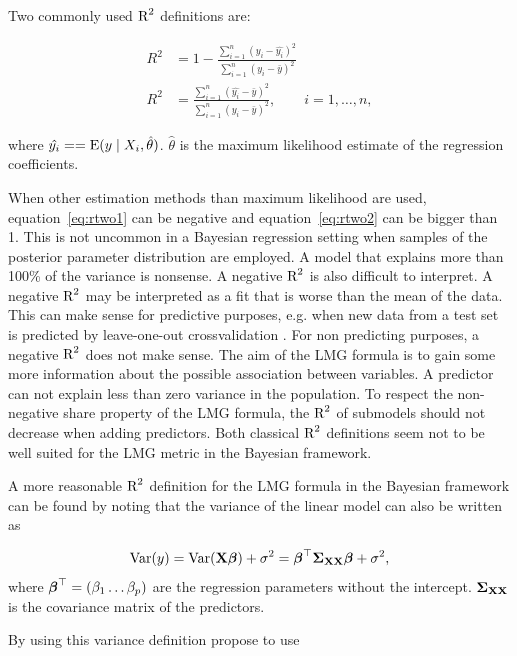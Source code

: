 \documentclass[11pt,a4paper,twoside]{book}\usepackage[]{graphicx}\usepackage[]{color}
\begin{document}
Two commonly used $\text{R}^2$ definitions are:
   
      \begin{align} 
     R^2 &= 1 - \frac{\sum_{i=1}^{n}(y_{i} - \hat{y_{i}})^2}{\sum_{i=1}^{n}(y_{i}-\bar{y})^2}   \label{eq:rtwo1} \\
     R^2 &= \frac{\sum_{i=1}^{n}(\hat{y_{i}} - \bar{y})^2}{\sum_{i=1}^{n}(y_{i}-\bar{y})^2}, \qquad i = 1,\dots,n,   \label{eq:rtwo2} 
   \end{align} 
   
where $\hat{y_{i}} = = \operatorname{E} ({y \mid X_{i}, \hat{\theta}})$.  $\hat{\theta}$ is the maximum likelihood estimate of the regression coefficients.


When other estimation methods than maximum likelihood are used, equation~\eqref{eq:rtwo1} can be negative and equation~\eqref{eq:rtwo2}  can be bigger than 1. This is not uncommon in a Bayesian regression setting when samples of the posterior parameter distribution are employed. A model that explains more than 100\% of the variance is nonsense. A negative $\text{R}^2$ is also difficult to interpret. A negative $\text{R}^2$ may be interpreted as a fit that is worse than the mean of the data. This can make sense for predictive purposes, e.g. when new data from a test set is predicted by leave-one-out crossvalidation \citep{Alexander2015}.  For non predicting purposes, a negative $\text{R}^2$ does not make sense. The aim of the LMG formula is to gain some more information about the possible association between variables. A predictor can not explain less than zero variance in the population. To respect the non-negative share property of the LMG formula, the $\text{R}^2$ of submodels should not decrease when adding predictors. Both classical $\text{R}^2$ definitions seem not to be well suited for the LMG metric in the Bayesian framework.

A more reasonable $\text{R}^2$ definition for the LMG formula in the Bayesian framework can be found by noting that the variance of the linear model can also be written as 

      \begin{align} 
        \operatorname{Var}(y) = \operatorname{Var}({\mathbf{X}} {\boldsymbol{\beta}}) + \sigma^2 = {\boldsymbol{\beta}}^\top {\boldsymbol{\Sigma}}{}_{{\mathbf{X}} {\mathbf{X}}}  {\boldsymbol{\beta}} + \sigma^2, \label{eq:vary} 
   \end{align}
where ${\boldsymbol{\beta}}^\top = (\beta_{1} \dots \beta_{p})$ are the regression parameters without the intercept.
${\boldsymbol{\Sigma}}{}_{{\mathbf{X}} {\mathbf{X}}}$ is the covariance matrix of the predictors.

By using this variance definition \cite{Gelman2017} propose to use 
\end{document}
